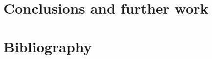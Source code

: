 \documentclass{svjour3}                     %
\begin{document}
\section{Conclusions and further work}







\section{Bibliography}


\printbibliography



\end{document}

